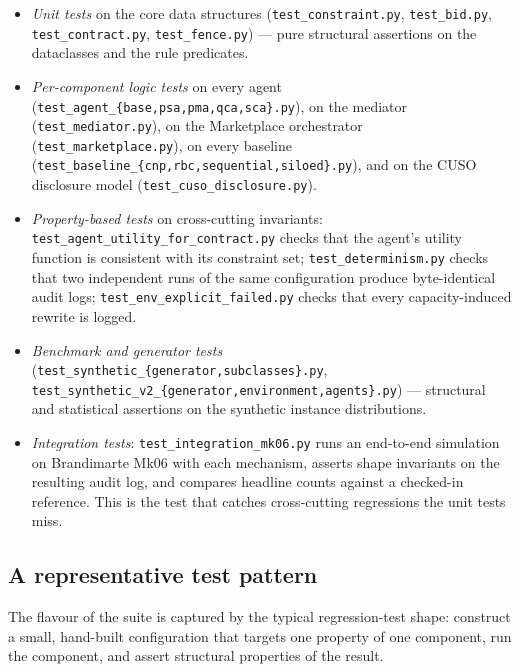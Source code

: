 \begin{itemize}[leftmargin=1.4em,itemsep=0.15em]
  \item \emph{Unit tests} on the core data structures
    (\texttt{test\_constraint.py}, \texttt{test\_bid.py},
    \texttt{test\_contract.py}, \texttt{test\_fence.py}) --- pure
    structural assertions on the dataclasses and the rule predicates.
  \item \emph{Per-component logic tests} on every agent
    (\texttt{test\_agent\_\{base,psa,pma,qca,sca\}.py}), on the
    mediator (\texttt{test\_mediator.py}), on the Marketplace
    orchestrator (\texttt{test\_marketplace.py}), on every baseline
    (\texttt{test\_baseline\_\{cnp,rbc,sequential,siloed\}.py}), and on
    the CUSO disclosure model (\texttt{test\_cuso\_disclosure.py}).
  \item \emph{Property-based tests} on cross-cutting invariants:
    \texttt{test\_agent\_utility\_for\_contract.py} checks that the
    agent's utility function is consistent with its constraint set;
    \texttt{test\_determinism.py} checks that two independent runs of
    the same configuration produce byte-identical audit logs;
    \texttt{test\_env\_explicit\_failed.py} checks that every
    capacity-induced rewrite is logged.
  \item \emph{Benchmark and generator tests}
    (\texttt{test\_synthetic\_\{generator,subclasses\}.py},
    \texttt{test\_synthetic\_v2\_\{generator,environment,agents\}.py})
    --- structural and statistical assertions on the synthetic
    instance distributions.
  \item \emph{Integration tests}: \texttt{test\_integration\_mk06.py}
    runs an end-to-end simulation on Brandimarte Mk06 with each
    mechanism, asserts shape invariants on the resulting audit log,
    and compares headline counts against a checked-in reference. This
    is the test that catches cross-cutting regressions the unit tests
    miss.
\end{itemize}

\subsection{A representative test pattern}

The flavour of the suite is captured by the typical regression-test
shape: construct a small, hand-built configuration that targets one
property of one component, run the component, and assert structural
properties of the result.

